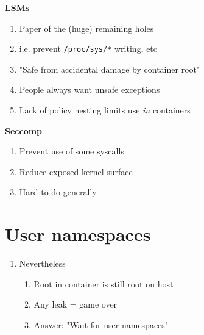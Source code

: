 \documentclass{beamer}
\begin{document}
\begin{frame}
\textbf{LSMs}
\begin{enumerate}
\item Paper of the (huge) remaining holes
\item i.e. prevent {\tt /proc/sys/*} writing, etc
\item "Safe from accidental damage by container root"
\item People always want unsafe exceptions
\item Lack of policy nesting limits use {\em in} containers
\end{enumerate}

\vspace{0.25in}

\textbf{Seccomp}
\begin{enumerate}
\item Prevent use of some syscalls
\item Reduce exposed kernel surface
\item Hard to do generally
\end{enumerate}
\end{frame}

\section{User namespaces}
\begin{frame}
\begin{enumerate}
\item Nevertheless
	\begin{enumerate}
	\item Root in container is still root on host
	\item Any leak = game over
	\item Answer: "Wait for user namespaces"
	\end{enumerate}
\end{enumerate}
\end{frame}
\end{document}

